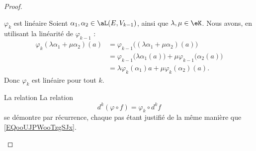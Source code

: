 \begin{proof}
    \begin{subproof}
        \item[\( \varphi_k\) est linéaire]
            Soient \( \alpha_1,\alpha_2\in \aL(E,V_{k-1})\), ainsi que \( \lambda,\mu\in \eK\). Nous avons, en utilisant la linéarité de \( \varphi_{k-1}\) :
            \begin{subequations}
                \begin{align}
                    \varphi_k(\lambda\alpha_1+\mu\alpha_2)(a)&=\varphi_{k-1}\big( (\lambda\alpha_1+\mu\alpha_2)(a) \big)\\
                    &=\varphi_{k-1}\big(\lambda \alpha_1(a)\big)+\mu\varphi_{k-1}\big( \alpha_2(a) \big)\\
                    &=\lambda\varphi_k(\alpha_1)a+\mu\varphi_k(\alpha_2)(a).
                \end{align}
            \end{subequations}
            Donc \( \varphi_k\) est linéaire pour tout \( k\).
        \item[La relation]
            La relation 
            \begin{equation}
                d^k(\varphi\circ f)=\varphi_k\circ d^kf
            \end{equation}
            se démontre par récurrence, chaque pas étant justifié de la même manière que \eqref{EQooUJPWooTzgSJx}.
    \end{subproof}
\end{proof}

